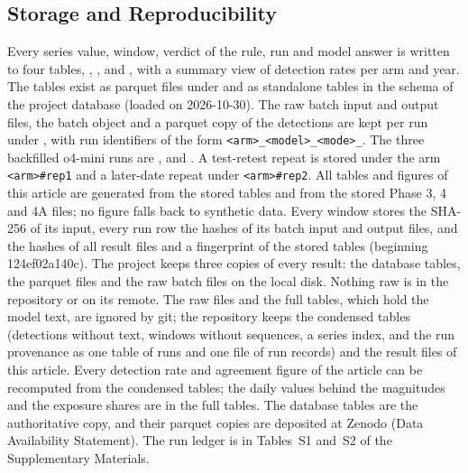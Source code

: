 \subsection{Storage and Reproducibility}
\label{sec:methods:storage}

Every series value, window, verdict of the rule, run and model answer is written to four tables, , ,  and , with a summary view of detection rates per arm and year. The tables exist as parquet files under  and as standalone tables in the  schema of the project database (loaded on 2026-10-30). The raw batch input and output files, the batch object and a parquet copy of the detections are kept per run under , with run identifiers of the form \texttt{<arm>\_<model>\_<mode>\_<UTC timestamp>}. The three backfilled o4-mini runs are ,  and . A test-retest repeat is stored under the arm \texttt{<arm>\#rep1} and a later-date repeat under \texttt{<arm>\#rep2}. All tables and figures of this article are generated from the stored tables and from the stored Phase 3, 4 and 4A files; no figure falls back to synthetic data.
Every window stores the SHA-256 of its input, every run row the hashes of its batch input and output files, and  the hashes of all result files and a fingerprint of the stored tables (beginning 124ef02a140c). The project keeps three copies of every result: the database tables, the parquet files and the raw batch files on the local disk. Nothing raw is in the repository or on its remote. The raw files and the full tables, which hold the model text, are ignored by git; the repository keeps the condensed tables (detections without text, windows without sequences, a series index, and the run provenance as one table of runs and one file of run records) and the result files of this article. Every detection rate and agreement figure of the article can be recomputed from the condensed tables; the daily values behind the magnitudes and the exposure shares are in the full tables. The database tables are the authoritative copy, and their parquet copies are deposited at Zenodo (Data Availability Statement). The run ledger is in Tables~S1 and~S2 of the Supplementary Materials.
